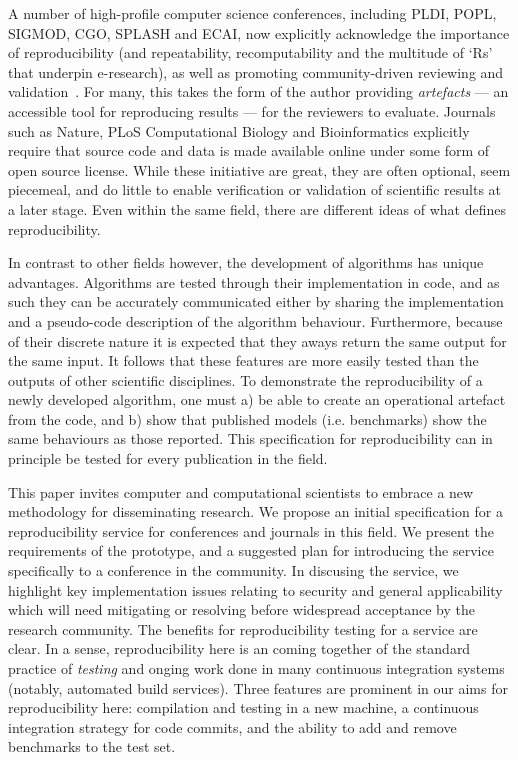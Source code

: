 \documentclass[conference]{IEEEtran}
\begin{document}
A number of high-profile computer science conferences, including PLDI,
POPL, SIGMOD, CGO, SPLASH and ECAI, now explicitly acknowledge the
importance of reproducibility (and repeatability, recomputability and
the multitude of `Rs' that underpin e-research), as well as promoting
community-driven reviewing and validation~\cite{fursin+dubach:2014}.
For many, this takes the form of the author providing \emph{artefacts} ---
an accessible tool for reproducing results --- for the reviewers to
evaluate. Journals such as Nature, PLoS Computational Biology and
Bioinformatics explicitly require that source code and data is made
available online under some form of open source license. While these
initiative are great, they are often optional, seem piecemeal, and do
little to enable verification or validation of scientific results at a
later stage. Even within the same field, there are different ideas of
what defines reproducibility.

In contrast to other fields however, the development of algorithms 
has unique advantages. Algorithms are tested through their implementation
in code, and as such they can be accurately communicated either by sharing
the implementation and a pseudo-code description of the algorithm behaviour.
Furthermore, because of their discrete nature it is expected that they aways
return the same output for the same input. It follows that these features 
are more easily tested than the outputs of other scientific disciplines.
To demonstrate the reproducibility of a newly developed algorithm, one must
a) be able to create an operational artefact from the code, and b) show that 
published models (i.e. benchmarks) show the same behaviours as those reported.
This specification for reproducibility can in principle be tested for every
publication in the field. 

This paper invites computer and computational scientists to embrace a new methodology
for disseminating research. We propose an initial specification for a
reproducibility service for conferences and journals in this field. We
present the requirements of the prototype, and a suggested plan for
introducing the service specifically to a conference in the
community. In discusing the service, we highlight key implementation
issues relating to security and general applicability which will need
mitigating or resolving before widespread acceptance by the research
community.  The benefits for reproducibility testing for a service are
clear. In a sense, reproducibility here is an coming together of the
standard practice of \emph{testing} and onging work done in many
continuous integration systems (notably, automated build services).  
Three features are prominent in our
aims for reproducibility here: compilation and testing in a new
machine, a continuous integration strategy for code commits, and the
ability to add and remove benchmarks to the test set. 
\end{document}
